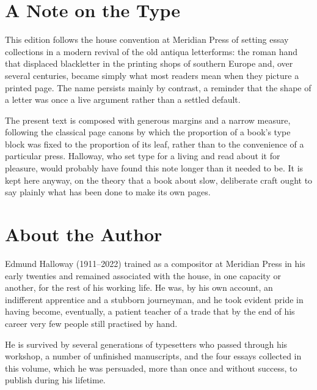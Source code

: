 \documentclass[11pt,twoside,post]{octavo}
\begin{document}
\backmatter

\chapter{A Note on the Type}

This edition follows the house convention at Meridian Press of setting essay collections in a modern revival of the old antiqua letterforms: the roman hand that displaced blackletter in the printing shops of southern Europe and, over several centuries, became simply what most readers mean when they picture a printed page. The name persists mainly by contrast, a reminder that the shape of a letter was once a live argument rather than a settled default.

The present text is composed with generous margins and a narrow measure, following the classical page canons by which the proportion of a book's type block was fixed to the proportion of its leaf, rather than to the convenience of a particular press. Halloway, who set type for a living and read about it for pleasure, would probably have found this note longer than it needed to be. It is kept here anyway, on the theory that a book about slow, deliberate craft ought to say plainly what has been done to make its own pages.

\chapter{About the Author}

Edmund Halloway (1911--2022) trained as a compositor at Meridian Press in his early twenties and remained associated with the house, in one capacity or another, for the rest of his working life. He was, by his own account, an indifferent apprentice and a stubborn journeyman, and he took evident pride in having become, eventually, a patient teacher of a trade that by the end of his career very few people still practised by hand.

He is survived by several generations of typesetters who passed through his workshop, a number of unfinished manuscripts, and the four essays collected in this volume, which he was persuaded, more than once and without success, to publish during his lifetime.
\end{document}
